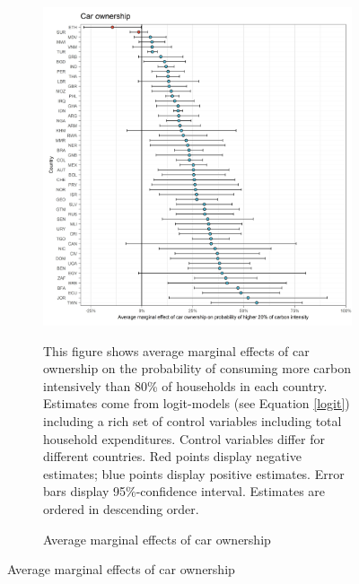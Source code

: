  \begin{figure}[ht!]\ContinuedFloat
   \centering
   \begin{subfigure}[b]{\textwidth}
   \centering
   \caption{Average marginal effects of car ownership} \label{fig:Logit_ME_car}
   \includegraphics{1_Figures/Analysis_Logit_Models_Marginal_Effects/Average_Marginal_Effects_affected_upper_80_car.01_2017.jpg}
   \begin{subcaption2}
     This figure shows average marginal effects of car ownership on the probability of consuming more carbon intensively than 80\% of households in each country. Estimates come from logit-models (see Equation \ref{logit}) including a rich set of control variables including total household expenditures. Control variables differ for different countries. Red points display negative estimates; blue points display positive estimates. Error bars display 95\%-confidence interval. Estimates are ordered in descending order.
   \end{subcaption2}
   \end{subfigure}
 \end{figure}
 \clearpage

